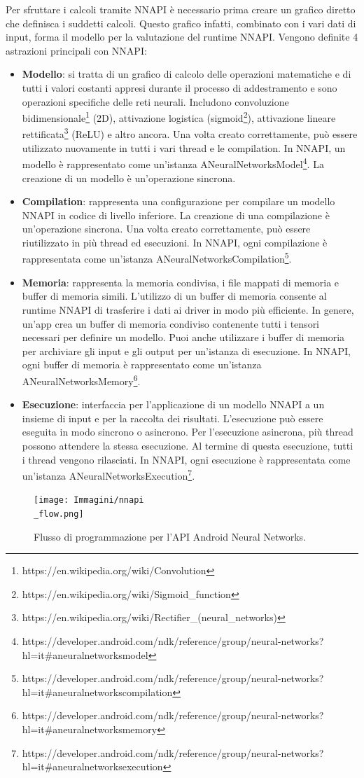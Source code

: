 Per sfruttare i calcoli tramite NNAPI è necessario prima creare un grafico diretto che definisca i suddetti calcoli. Questo grafico infatti, combinato con
i vari dati di input, forma il modello per la valutazione del runtime NNAPI. Vengono definite 4 astrazioni principali con NNAPI:
\begin{itemize}
    \item \textbf{Modello}: si tratta di un grafico di calcolo delle operazioni matematiche e di tutti i valori costanti appresi durante il processo
    di addestramento e sono operazioni specifiche delle reti neurali. Includono convoluzione bidimensionale\footnote{https://en.wikipedia.org/wiki/Convolution}
    (2D), attivazione logistica (sigmoid\footnote{https://en.wikipedia.org/wiki/Sigmoid\_function}), attivazione lineare rettificata\footnote{https://en.wikipedia.org/wiki/Rectifier\_(neural\_networks)}
    (ReLU) e altro ancora. Una volta creato correttamente, può essere utilizzato nuovamente in tutti i vari thread e le compilation. In NNAPI, un modello
    è rappresentato come un'istanza ANeuralNetworksModel\footnote{https://developer.android.com/ndk/reference/group/neural-networks?hl=it\#aneuralnetworksmodel}.
    La creazione di un modello è un'operazione sincrona.
    \item \textbf{Compilation}: rappresenta una configurazione per compilare un modello NNAPI in codice di livello inferiore. La creazione di una
    compilazione è un'operazione sincrona. Una volta creato correttamente, può essere riutilizzato in più thread ed esecuzioni. In NNAPI, ogni
    compilazione è rappresentata come un'istanza ANeuralNetworksCompilation\footnote{https://developer.android.com/ndk/reference/group/neural-networks?hl=it\#aneuralnetworkscompilation}.
    \item \textbf{Memoria}: rappresenta la memoria condivisa, i file mappati di memoria e buffer di memoria simili. L'utilizzo di un buffer di memoria
    consente al runtime NNAPI di trasferire i dati ai driver in modo più efficiente. In genere, un'app crea un buffer di memoria condiviso contenente
    tutti i tensori necessari per definire un modello. Puoi anche utilizzare i buffer di memoria per archiviare gli input e gli output per un'istanza di
    esecuzione. In NNAPI, ogni buffer di memoria è rappresentato come un'istanza ANeuralNetworksMemory\footnote{https://developer.android.com/ndk/reference/group/neural-networks?hl=it\#aneuralnetworksmemory}.
    \item \textbf{Esecuzione}: interfaccia per l'applicazione di un modello NNAPI a un insieme di input e per la raccolta dei risultati. L'esecuzione
    può essere eseguita in modo sincrono o asincrono. Per l'esecuzione asincrona, più thread possono attendere la stessa esecuzione. Al termine di questa
    esecuzione, tutti i thread vengono rilasciati. In NNAPI, ogni esecuzione è rappresentata come un'istanza ANeuralNetworksExecution\footnote{https://developer.android.com/ndk/reference/group/neural-networks?hl=it\#aneuralnetworksexecution}.
\end{itemize}

\begin{figure}
    \centering
    \texttt{[image: Immagini/nnapi\\\_flow.png]}
    \caption{Flusso di programmazione per l'API Android Neural Networks.}
    \label{}
\end{figure}



